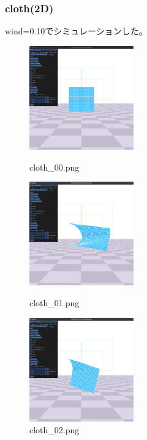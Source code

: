 \documentclass[a4paper,10pt,uplatex,dvipdfmx]{jsarticle}
\begin{document}
\subsubsection{cloth(2D)}
wind=0.10でシミュレーションした。
\begin{figure}[H]
  \begin{minipage}{0.33\hsize}
    \begin{center}
      \includegraphics[width=45mm]{img/cloth_00.png}
      \caption{cloth\_00.png}
    \end{center}
  \end{minipage}
  \begin{minipage}{0.33\hsize}
    \begin{center}
      \includegraphics[width=45mm]{img/cloth_01.png}
      \caption{cloth\_01.png}
    \end{center}
  \end{minipage}
  \begin{minipage}{0.33\hsize}
    \begin{center}
      \includegraphics[width=45mm]{img/cloth_02.png}
      \caption{cloth\_02.png}
    \end{center}
  \end{minipage}
\end{figure}
\end{document}
